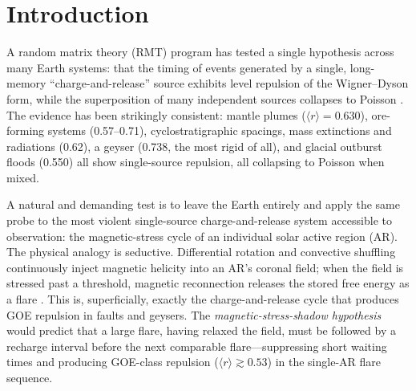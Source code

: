 \documentclass[12pt,a4paper]{article}
\begin{document}
\begin{abstract}
($\chi^2$ test $p=0.81$ over rise, maximum, and decline), while whole-disk clustering strengthens into the decline (CV $2.2\to3.1$). The failure of solar flares to repel is thus not a flaw in the unifying principle but a measurement of where its mechanism switches off.

\medskip
\noindent\textbf{Keywords:} random matrix theory; solar flares; magnetic reconnection; active regions; level repulsion; reservoir depletion; waiting-time distribution; GOES; Poisson process; self-organized criticality

\medskip
\noindent\textbf{Code/data:} \url{https://github.com/Ruqing1963/solar-flare-rmt-depletion}\\
\textbf{Companion studies:} \url{https://zenodo.org/records/20768420} ; \url{https://zenodo.org/records/20768849} ; \url{https://zenodo.org/records/20774581} ; \url{https://zenodo.org/records/20783763}
\end{abstract}

\section{Introduction}

A random matrix theory (RMT) program has tested a single hypothesis across many Earth systems: that the timing of events generated by a single, long-memory ``charge-and-release'' source exhibits level repulsion of the Wigner--Dyson form, while the superposition of many independent sources collapses to Poisson \citep{chen2026plume,chen2026metal,chen2026strat,chen2026evo,chen2026hydro}. The evidence has been strikingly consistent: mantle plumes ($\langle r\rangle=0.630$), ore-forming systems (0.57--0.71), cyclostratigraphic spacings, mass extinctions and radiations (0.62), a geyser (0.738, the most rigid of all), and glacial outburst floods (0.550) all show single-source repulsion, all collapsing to Poisson when mixed.

A natural and demanding test is to leave the Earth entirely and apply the same probe to the most violent single-source charge-and-release system accessible to observation: the magnetic-stress cycle of an individual solar active region (AR). The physical analogy is seductive. Differential rotation and convective shuffling continuously inject magnetic helicity into an AR's coronal field; when the field is stressed past a threshold, magnetic reconnection releases the stored free energy as a flare \citep{priest2002,shibata2011}. This is, superficially, exactly the charge-and-release cycle that produces GOE repulsion in faults and geysers. The \emph{magnetic-stress-shadow hypothesis} would predict that a large flare, having relaxed the field, must be followed by a recharge interval before the next comparable flare---suppressing short waiting times and producing GOE-class repulsion ($\langle r\rangle\gtrsim0.53$) in the single-AR flare sequence.
\end{document}

